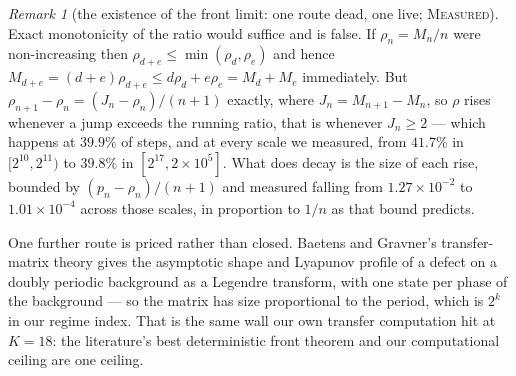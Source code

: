 \documentclass[11pt]{article}
\theoremstyle{definition}
\theoremstyle{remark}
\newtheorem{remark}[theorem]{Remark}
\newcommand{\MEASURED}{\textsc{Measured}}
\begin{document}
\begin{remark}[the existence of the front limit: one route dead, one live; \MEASURED]
Exact monotonicity of the ratio would suffice and is false. If $\rho_n=M_n/n$ were non-increasing then
$\rho_{d+e}\le\min(\rho_d,\rho_e)$ and hence $M_{d+e}=(d+e)\rho_{d+e}\le d\rho_d+e\rho_e=M_d+M_e$
immediately. But $\rho_{n+1}-\rho_n=(J_n-\rho_n)/(n+1)$ exactly, where $J_n=M_{n+1}-M_n$, so $\rho$
rises whenever a jump exceeds the running ratio, that is whenever $J_n\ge2$ --- which happens at
$39.9\%$ of steps, and at every scale we measured, from $41.7\%$ in $[2^{10},2^{11})$ to $39.8\%$ in
$[2^{17},2\times10^{5}]$. What does decay is the size of each rise, bounded by $(p_n-\rho_n)/(n+1)$
and measured falling from $1.27\times10^{-2}$ to $1.01\times10^{-4}$ across those scales, in proportion
to $1/n$ as that bound predicts.

One further route is priced rather than closed. Baetens and Gravner's transfer-matrix theory
\cite[Thms.~6.1, 6.2]{BGrav} gives the asymptotic shape and Lyapunov profile of a defect on a doubly
periodic background as a Legendre transform, with one state per phase of the background --- so the
matrix has size proportional to the period, which is $2^{k}$ in our regime index. That is the same wall
our own transfer computation hit at $K=18$: the literature's best deterministic front theorem and our
computational ceiling are one ceiling.
\end{remark}
\end{document}
